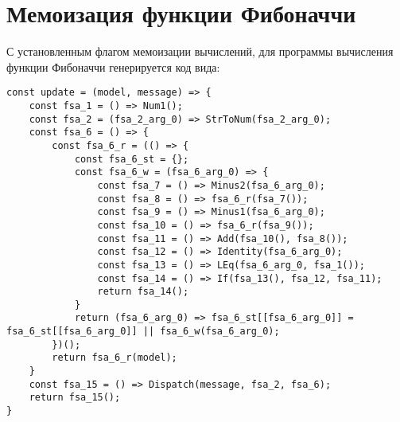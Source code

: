 \section{Мемоизация функции Фибоначчи}\label{sec:ch4/sect4}

С установленным флагом мемоизации вычислений, для программы вычисления функции Фибоначчи
генерируется код вида:

\begin{lstlisting}
const update = (model, message) => {
    const fsa_1 = () => Num1();
    const fsa_2 = (fsa_2_arg_0) => StrToNum(fsa_2_arg_0);
    const fsa_6 = () => {
        const fsa_6_r = (() => {
            const fsa_6_st = {};
            const fsa_6_w = (fsa_6_arg_0) => {
                const fsa_7 = () => Minus2(fsa_6_arg_0);
                const fsa_8 = () => fsa_6_r(fsa_7());
                const fsa_9 = () => Minus1(fsa_6_arg_0);
                const fsa_10 = () => fsa_6_r(fsa_9());
                const fsa_11 = () => Add(fsa_10(), fsa_8());
                const fsa_12 = () => Identity(fsa_6_arg_0);
                const fsa_13 = () => LEq(fsa_6_arg_0, fsa_1());
                const fsa_14 = () => If(fsa_13(), fsa_12, fsa_11);
                return fsa_14();
            }
            return (fsa_6_arg_0) => fsa_6_st[[fsa_6_arg_0]] = fsa_6_st[[fsa_6_arg_0]] || fsa_6_w(fsa_6_arg_0);
        })();
        return fsa_6_r(model);
    }
    const fsa_15 = () => Dispatch(message, fsa_2, fsa_6);
    return fsa_15();
}
\end{lstlisting}

\clearpage
